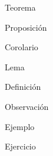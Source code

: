 \documentclass[12pt]{report}
\theoremstyle{largebreak}
\begin{document}
    

    \newpage

    \begin{theor}[Nombre]
        Teorema
    \end{theor}

    \begin{propo}[Nombre]
        Proposición
    \end{propo}

    \begin{cor}[Nombre]
        Corolario
    \end{cor}

    \begin{lema}[Nombre]
        Lema
    \end{lema}

    \begin{mydef}[Nombre]
        Definición
    \end{mydef}

    \begin{obs}[Nombre]
        Observación
    \end{obs}

    \begin{exa}[Nombre]
        Ejemplo
    \end{exa}

    \begin{excer}[Nombre]
        Ejercicio
    \end{excer}
\end{document}
